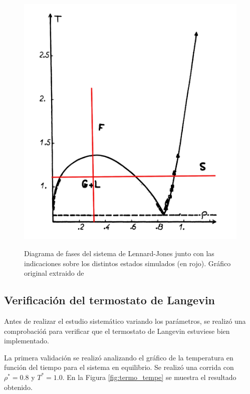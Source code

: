 \documentclass[a4paper,12pt]{article}
\begin{document}
\begin{figure}[H]
	\centering
	\includegraphics[scale=0.1]{fases.png} \\
	\caption{Diagrama de fases del sistema de Lennard-Jones junto con las 
	indicaciones sobre los distintos estados simulados (en rojo). Gráfico 
	original extraido de \cite{hansenverlet1969}}\label{fig:fases}
\end{figure}

\subsection{Verificación del termostato de Langevin}

Antes de realizar el estudio sistemático variando los parámetros, se realizó 
una comprobacióń para verificar que el termostato de Langevin estuviese bien 
implementado.

La primera validación se realizó analizando el gráfico de la temperatura en 
función del tiempo para el sistema en equilibrio. Se realizó una corrida con 
$\rho^*=0.8$ y $T^*=1.0$. En la Figura \eqref{fig:termo_tempe} se muestra el 
resultado obtenido.
\end{document}
